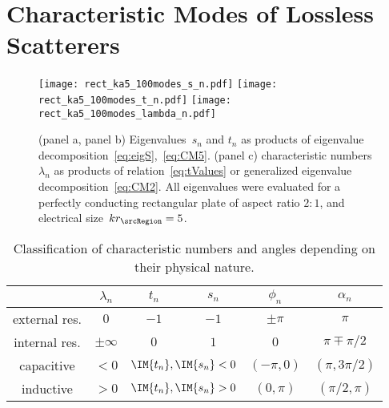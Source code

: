 \documentclass[journal]{IEEEtran}
\providecommand{\aCircum}{r_\srcRegion} %
\begin{document}
\section{Characteristic Modes of Lossless Scatterers}
\label{sec:CM}

\begin{figure*}
\centering
\texttt{[image: rect\_ka5\_100modes\_s\_n.pdf]}
\texttt{[image: rect\_ka5\_100modes\_t\_n.pdf]}
\texttt{[image: rect\_ka5\_100modes\_lambda\_n.pdf]}
\caption{(panel a, panel b) Eigenvalues~$s_n$ and $t_n$ as products of eigenvalue decomposition~\eqref{eq:eigS},~\eqref{eq:CM5}. (panel c) characteristic numbers~$\lambda_n$ as products of relation~\eqref{eq:tValues} or generalized eigenvalue decomposition~\eqref{eq:CM2}. All eigenvalues were evaluated for a perfectly conducting rectangular plate of aspect ratio $2:1$, and electrical size~$k\aCircum = 5$.}
\label{fig2}
\end{figure*}

\begin{table}[]
\label{tab:values}
\caption{Classification of characteristic numbers and angles depending on their physical nature.}
\centering
\begin{tabular}{cccccc} 
& $\lambda_n$ & $t_n$ & $s_n$ & $\phi_n$ & $\alpha_n$ \\ [0.5ex] 
\toprule
external res. & $0$ & $-1$ & $-1$ & $\pm\pi$ & $\pi$ \\
internal res. & $\pm \infty$ & $0$ & $1$ & $0$ & $ \pi \mp \pi/2$ \\ \midrule
capacitive & $<0$ & \multicolumn{2}{c}{$\IM\{ t_n\}, \IM\{s_n\} < 0$} & $(-\pi,0)$ & $(\pi,3\pi/2)$ \\
inductive & $>0$ & \multicolumn{2}{c}{$\IM\{ t_n\}, \IM\{s_n\} > 0$} & $(0,\pi)$ & $(\pi/2, \pi)$ \\
\bottomrule
\end{tabular}
\end{table}
\end{document}
